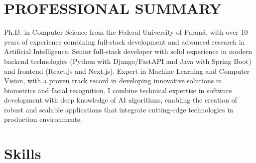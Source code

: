 \documentclass[12pt,a4paper,sans]{moderncv}        %
\begin{document}
\makecvtitle

\vspace{12pt}
\section{PROFESSIONAL SUMMARY}

\small{Ph.D. in Computer Science from the Federal University of Paraná, with over 10 years of experience combining full-stack development and advanced research in Artificial Intelligence. Senior full-stack developer with solid experience in modern backend technologies (Python with Django/FastAPI and Java with Spring Boot) and frontend (React.js and Next.js). Expert in Machine Learning and Computer Vision, with a proven track record in developing innovative solutions in biometrics and facial recognition. I combine technical expertise in software development with deep knowledge of AI algorithms, enabling the creation of robust and scalable applications that integrate cutting-edge technologies in production environments.}

\vspace{12pt}
\section{Skills}
\end{document}
